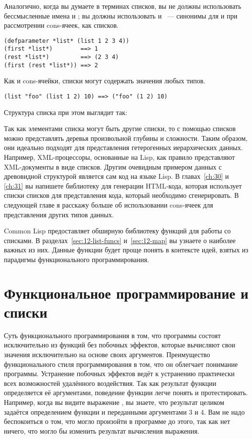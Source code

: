 Аналогично, когда вы думаете в терминах списков, вы не должны использовать бессмысленные
имена  и ; вы должны использовать  и ~---
синонимы для  и  при рассмотрении cons-ячеек, как списков.

\begin{lstlisting}
(defparameter *list* (list 1 2 3 4))
(first *list*)        ==> 1
(rest *list*)         ==> (2 3 4)
(first (rest *list*)) ==> 2
\end{lstlisting}

Как и cons-ячейки, списки могут содержать значения любых типов.

\begin{lstlisting}
(list "foo" (list 1 2) 10) ==> ("foo" (1 2) 10)
\end{lstlisting}

Структура списка при этом выглядит так:


Так как элементами списка могут быть другие списки, то с помощью списков можно представлять
деревья произвольной глубины и сложности. Таким образом, они идеально подходят для
представления гетерогенных иерархических данных. Например, XML-процессоры, основанные на
Lisp, как правило представляют XML-документы в виде списков. Другим очевидным примером
данных с древовидной структурой является сам код на языке Lisp. В главах~\ref{ch:30} и
\ref{ch:31} вы
напишете библиотеку для генерации HTML-кода, которая использует списки списков для
представления кода, который необходимо сгенерировать. В следующей главе я расскажу больше
об использовании cons-ячеек для представления других типов данных.

Common Lisp предоставляет обширную библиотеку функций для работы со списками. В
разделах~\ref{sec:12-list-funcs} и~\ref{sec:12-map} вы узнаете о наиболее важных из
них. Данные функции будет проще понять в контексте идей, взятых из парадигмы
функционального программирования.

\section{Функциональное программирование и списки}

Суть функционального программирования в том, что программы состоят исключительно из
функций без побочных эффектов, которые вычисляют свои значения исключительно на основе
своих аргументов. Преимущество функционального стиля программирования в том, что он
облегчает понимание программы. Устранение побочных эффектов ведёт к устранению практически
всех возможностей удалённого воздействия. Так как результат функции определяется её
аргументами, поведение функции легче понять и протестировать. Например, когда вы видите
выражение , вы знаете, что результат целиком задаётся определением функции
\code{+} и переданными аргументами 3 и 4. Вам не надо беспокоиться о том, что могло
произойти в программе до этого, так как нет ничего, что могло бы изменить результат
вычисления выражения.

